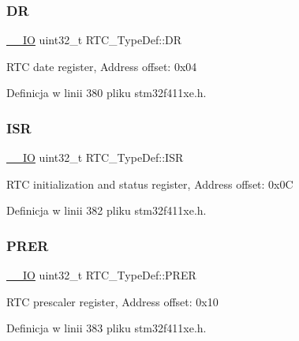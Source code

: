 \subsubsection{\texorpdfstring{DR}{DR}}
{\footnotesize\ttfamily \hyperlink{core__sc300_8h_aec43007d9998a0a0e01faede4133d6be}{\+\_\+\+\_\+\+IO} uint32\+\_\+t R\+T\+C\+\_\+\+Type\+Def\+::\+DR}

R\+TC date register, Address offset\+: 0x04 

Definicja w linii 380 pliku stm32f411xe.\+h.

\mbox{\label{struct_r_t_c___type_def_a5a7b104d80b48b5708b50cdc487d6a78}} 
\subsubsection{\texorpdfstring{I\+SR}{ISR}}
{\footnotesize\ttfamily \hyperlink{core__sc300_8h_aec43007d9998a0a0e01faede4133d6be}{\+\_\+\+\_\+\+IO} uint32\+\_\+t R\+T\+C\+\_\+\+Type\+Def\+::\+I\+SR}

R\+TC initialization and status register, Address offset\+: 0x0C 

Definicja w linii 382 pliku stm32f411xe.\+h.

\mbox{\label{struct_r_t_c___type_def_a5f43a11e0873212f598e41db5f2dcf6a}} 
\subsubsection{\texorpdfstring{P\+R\+ER}{PRER}}
{\footnotesize\ttfamily \hyperlink{core__sc300_8h_aec43007d9998a0a0e01faede4133d6be}{\+\_\+\+\_\+\+IO} uint32\+\_\+t R\+T\+C\+\_\+\+Type\+Def\+::\+P\+R\+ER}

R\+TC prescaler register, Address offset\+: 0x10 

Definicja w linii 383 pliku stm32f411xe.\+h.

\mbox{\label{struct_r_t_c___type_def_a09936292ef8d82974b55a03a1080534e}} 
